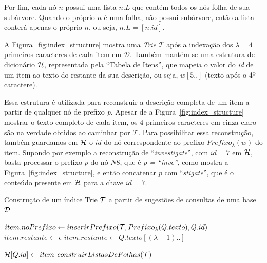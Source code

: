 Por fim, cada nó $n$ possui uma lista $n.L$ que contém todos os nós-folha de sua subárvore. Quando o próprio $n$ é uma folha, não possui subárvore, então a lista conterá apenas o próprio $n$, ou seja, $n.L = [n.id]$.

A Figura~\ref{fig:index_structure} mostra uma \textit{Trie} $\mathcal{T}$ após a indexação dos $\lambda = 4$ primeiros caracteres de cada item em $\mathcal{D}$. Também mantém-se uma estrutura de dicionário $\mathcal{H}$, representada pela ``Tabela de Itens'', que mapeia o valor do \textit{id} de um item ao texto do restante da sua descrição, ou seja, $w[5..]$ (texto após o 4º caractere).

Essa estrutura é utilizada para reconstruir a descrição completa de um item a partir de qualquer nó de prefixo \textit{p}. Apesar de a Figura~\ref{fig:index_structure} mostrar o texto completo de cada item, os $4$ primeiros caracteres em cinza claro são na verdade obtidos ao caminhar por $\mathcal{T}$. Para possibilitar essa reconstrução, também guardamos em $\mathcal{H}$ o $id$ do nó correspondente ao prefixo $Prefixo_{\lambda}(w)$ do item. Supondo por exemplo a reconstrução de ``\textit{investigate}'', com $id=7$ em $\mathcal{H}$, basta processar o prefixo $p$ do nó $N8$, que é \textit{p = ``inve''}, como mostra a Figura~\ref{fig:index_structure}, e então concatenar $p$ com ``\textit{stigate}'', que é o conteúdo presente em $\mathcal{H}$ para a chave $id=7$.

\begin{algorithm}[ht]
\caption{Construção de um índice Trie $\mathcal{T}$ a partir de sugestões de consultas de uma base $\mathcal{D}$}\label{alg:dataset_indexing}
\begin{algorithmic}[1]
        \State $item.noPrefixo \leftarrow inserirPrefixo(\mathcal{T}, Prefixo_{\lambda}(Q.texto), Q.id)$
            \State $item.restante \leftarrow \epsilon$
         \Else{}
            \State $item.restante \leftarrow Q.texto[(\lambda + 1)..]$
         \EndIf
         
         \State $\mathcal{H}[Q.id] \leftarrow item$
    \EndFor
    \State $construirListasDeFolhas(\mathcal{T})$
\EndFunction
\end{algorithmic}
\end{algorithm}

